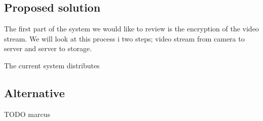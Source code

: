 
\subsection{Proposed solution}


The first part of the system we would like to review is the encryption
of the video stream. We will look at this process i two steps; video
stream from camera to server and server to storage.

The current system distributes


\subsection{Alternative}





TODO marcus
